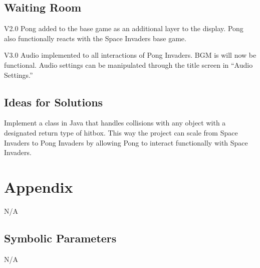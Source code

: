 \documentclass[12pt, titlepage]{article}
\begin{document}
\subsection{Waiting Room}
V2.0 Pong added to the base game as an additional layer to the display. Pong also functionally reacts with the Space Invaders base game.

V3.0 Audio implemented to all interactions of Pong Invaders. BGM is will now be functional. Audio settings can be manipulated through the title screen in “Audio Settings.”

\subsection{Ideas for Solutions}
Implement a class in Java that handles collisions with any object with a designated return type of hitbox. This way the project can scale from Space Invaders to Pong Invaders by allowing Pong to interact functionally with Space Invaders.



\newpage
\section{Appendix}
N/A
\subsection{Symbolic Parameters}
N/A
\end{document}
